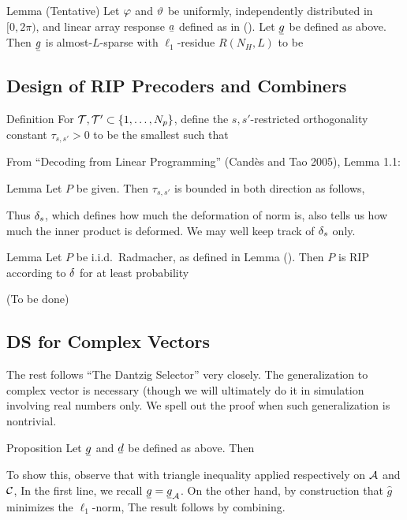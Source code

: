 \Result
{Lemma (Tentative)}
{
Let \(\varphi\) and \(\vartheta\) be uniformly, independently distributed in \([0,2\pi)\), and linear array response \(\V{a}\) defined as in ().
Let \(\V{g}\) be defined as above.
Then \(\V{g}\) is almost-\(L\)-sparse with \(\ell_1\)-residue \(R(N_H, L)\) to be
%
}

\subsection{Design of RIP Precoders and Combiners}

\Result
{Definition}
{
For \(\mathcal{T}, \mathcal{T}' \subset \{1, \dotsc, N_p\}\), define the \(s, s'\)-restricted orthogonality constant \(\tau_{s,s'} >0\) to be the smallest such that
%
}

From ``Decoding from Linear Programming'' (Cand\`es and Tao 2005), Lemma 1.1:

\Result
{Lemma}
{
Let \(P\) be given.
Then \(\tau_{s, s'}\) is bounded in both direction as follows,
}

Thus \(\delta_s\), which defines how much the deformation of norm is, also tells us how much the inner product is deformed.
We may well keep track of \(\delta_s\) only.

\Result
{Lemma}
{
Let \(P\) be i.i.d.\ Radmacher, as defined in Lemma ().
Then \(P\) is RIP according to \(\delta\) for at least probability
}


{ \color{red} (To be done) }

\subsection{DS for Complex Vectors}

The rest follows ``The Dantzig Selector'' very closely.
The generalization to complex vector is necessary (though we will ultimately do it in simulation involving real numbers only.
We spell out the proof when such generalization is nontrivial.

\Result
{Proposition}
{
Let \(\V{g}\) and \(\V{d}\) be defined as above.
Then
%
}

To show this, observe that with triangle inequality applied respectively on \(\mathcal{A}\) and \(\mathcal{C}\),
In the first line, we recall \(\V{g} =\V{g}_{\MC{A}}\).
On the other hand, by construction that \(\hat{g}\) minimizes the \(\ell_1\)-norm,
The result follows by combining.

